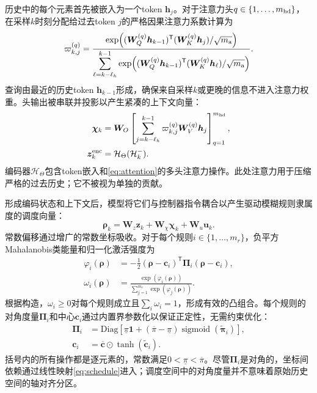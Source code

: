 \documentclass[journal]{IEEEtran}
\newcommand{\T}{\mathsf T}
\newcommand{\1}{\bm 1}
\begin{document}
历史中的每个元素首先被嵌入为一个token $\bm h_j$。对于注意力头$q\in\{1,\ldots,m_{\rm hd}\}$，在采样$k$时刻分配给过去token $j$的严格因果注意力系数计算为
\begin{equation}
\varpi_{k,j}^{(q)}
=\frac{\exp\!\left(
(\bm W_Q^{(q)}\bm h_{k-1})^\T
(\bm W_K^{(q)}\bm h_j)/\sqrt{m_{\rm a}}\right)}
{\displaystyle\sum_{\ell=k-\ell_h}^{k-1}
\exp\!\left(
(\bm W_Q^{(q)}\bm h_{k-1})^\T
(\bm W_K^{(q)}\bm h_\ell)/\sqrt{m_{\rm a}}\right)}.
\label{eq:attention}
\end{equation}
查询由最近的历史token $\bm h_{k-1}$形成，确保来自采样$k$或更晚的信息不进入注意力权重。头输出被串联并投影以产生紧凑的上下文向量：
\begin{equation}
\begin{aligned}
\bm\chi_k&=\bm W_O
\left[
\sum_{j=k-\ell_h}^{k-1}\varpi_{k,j}^{(q)}
\bm W_V^{(q)}\bm h_j
\right]_{q=1}^{m_{\rm hd}},
\\
\bm z_k^{\rm enc}&=\mathcal H_\Theta(\mathcal H_k^-).
\end{aligned}
\label{eq:encoder}
\end{equation}
编码器$\mathcal H_\Theta$包含token嵌入和\eqref{eq:attention}的多头注意力操作。此处注意力用于压缩严格的过去历史；它不被视为单独的贡献。

形成编码状态和上下文后，模型将它们与控制器指令耦合以产生驱动模糊规则隶属度的调度向量：
\begin{equation}
\bm\rho_k=\bm W_z\bm z_k+\bm W_\chi\bm\chi_k+
\bm W_u\bm u_k.
\label{eq:schedule}
\end{equation}
常数偏移通过增广的常数坐标吸收。对于每个规则$i\in\{1,\ldots,m_r\}$，负平方Mahalanobis类能量和归一化激活强度为
\begin{equation}
\begin{aligned}
\varphi_i(\bm\rho)
&=-\frac{1}{2}(\bm\rho-\bm c_i)^\T
\bm\Pi_i(\bm\rho-\bm c_i),\\
\omega_i(\bm\rho)
&=\frac{\exp(\varphi_i(\bm\rho))}
{\displaystyle\sum_{j=1}^{m_r}\exp(\varphi_j(\bm\rho))}.
\end{aligned}
\label{eq:fuzzy_weights}
\end{equation}
根据构造，$\omega_i\geq0$对每个规则成立且$\sum_i\omega_i=1$，形成有效的凸组合。每个规则的对角度量$\bm\Pi_i$和中心$\bm c_i$通过内置界参数化以保证正定性，无需约束优化：
\begin{equation}
\begin{aligned}
\bm\Pi_i&=\mathrm{Diag}\!\left[
\underline{\pi}\1+
(\overline{\pi}-\underline{\pi})
\operatorname{sigmoid}(\widetilde{\bm\pi}_i)\right],\\
\bm c_i&=\overline{\bm c}\odot\tanh(\widetilde{\bm c}_i).
\end{aligned}
\label{eq:metric_parameterization}
\end{equation}
括号内的所有操作都是逐元素的，常数满足$0<\underline{\pi}<\overline{\pi}$。尽管$\bm\Pi_i$是对角的，坐标间依赖通过线性映射\eqref{eq:schedule}进入；调度空间中的对角度量并不意味着原始历史空间的轴对齐分区。
\end{document}
